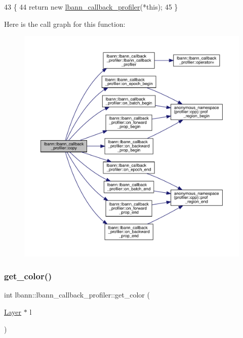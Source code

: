 \begin{DoxyCode}
43                                                  \{
44     \textcolor{keywordflow}{return} \textcolor{keyword}{new} \hyperlink{classlbann_1_1lbann__callback__profiler_aa1df0f5400362d0b4c469df5d4657eed}{lbann\_callback\_profiler}(*\textcolor{keyword}{this});
45   \}
\end{DoxyCode}
Here is the call graph for this function\+:\nopagebreak
\begin{figure}[H]
\begin{center}
\leavevmode
\includegraphics[width=350pt]{classlbann_1_1lbann__callback__profiler_a53351de95859a8a9f3a689ed72970663_cgraph}
\end{center}
\end{figure}
\mbox{\label{classlbann_1_1lbann__callback__profiler_af78237a67eaacf2508f31ad72b8ff8a7}} 
\subsubsection{\texorpdfstring{get\+\_\+color()}{get\_color()}}
{\footnotesize\ttfamily int lbann\+::lbann\+\_\+callback\+\_\+profiler\+::get\+\_\+color (\begin{DoxyParamCaption}\item[{\hyperlink{classlbann_1_1Layer}{Layer} $\ast$}]{l }\end{DoxyParamCaption})\hspace{0.3cm}{\ttfamily [private]}}



